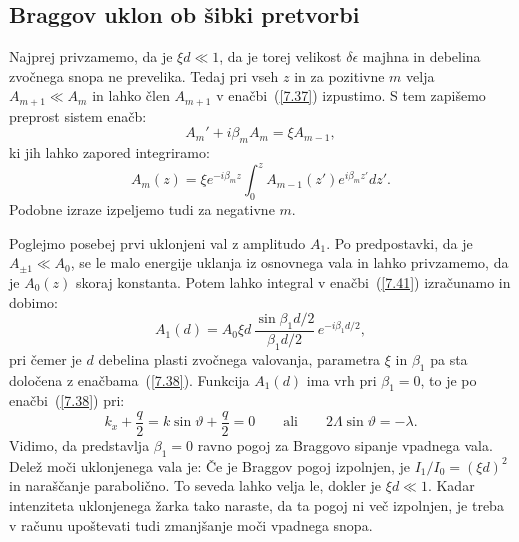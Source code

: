 \subsection*{Braggov uklon ob šibki pretvorbi}
Najprej privzamemo, da je $\xi d\ll 1$, da je torej velikost $\delta \epsilon$
majhna in debelina zvočnega snopa ne prevelika. Tedaj pri vseh
$z$ in za pozitivne $m$ velja $A_{m+1}\ll A_{m}$ in lahko člen $A_{m+1}$
v enačbi~(\ref{7.37}) izpustimo. S tem zapišemo preprost sistem enačb:
\begin{equation}
A_{m}'+i\beta_{m}A_{m}=\xi A_{m-1},
\label{7.40}
\end{equation}
 ki jih lahko zapored integriramo:
\begin{equation}
A_{m}(z)=\xi e^{-i\beta_{m}z}\int_{0}^{z}A_{m-1}(z')
e^{i\beta_{m}z'}dz'.
\label{7.41}
\end{equation}
Podobne izraze izpeljemo tudi za negativne $m$.

Poglejmo posebej prvi uklonjeni val z amplitudo $A_{1}$. Po predpostavki,
da je $A_{\pm1}\ll A_{0}$, se le malo energije uklanja iz osnovnega
vala in lahko privzamemo, da je $A_{0}(z)$ skoraj konstanta. 
Potem lahko integral v enačbi~(\ref{7.41})
izračunamo in dobimo:
\begin{equation}
A_{1}(d)=A_{0}\xi d\,\frac{\sin\beta_{1}d/2}{\beta_{1}d/2}\, e^{-i\beta_{1}d/2},
\label{7.41a}
\end{equation}
pri čemer je $d$ debelina plasti zvočnega valovanja, parametra $\xi$ in $\beta_1$ pa 
sta določena z enačbama~(\ref{7.38}).
Funkcija $A_{1}(d)$ ima vrh pri $\beta_{1}=0$, to je po enačbi~(\ref{7.38}) pri:
\begin{equation}
k_x+ \frac{q}{2} = k \sin\vartheta + \frac{q}{2} = 0
\qquad \mathrm{ali} \qquad 
2\Lambda\sin\vartheta=-\lambda.
\label{7.43}
\end{equation}
Vidimo, da predstavlja $\beta_{1}=0$ ravno pogoj za Braggovo sipanje vpadnega
vala.
Delež moči uklonjenega vala je:
Če je Braggov pogoj izpolnjen, je $I_{1}/I_{0}=(\xi d)^{2}$ in naraščanje parabolično. To seveda
lahko velja le, dokler je $\xi d\ll1$. Kadar intenziteta uklonjenega žarka
tako naraste, da ta pogoj ni več izpolnjen, je treba v računu upoštevati tudi 
zmanjšanje moči vpadnega snopa.

